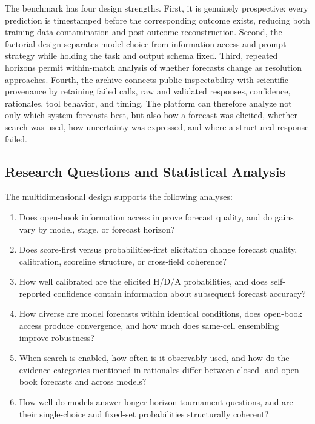 The benchmark has four design strengths. First, it is genuinely prospective: every prediction is
timestamped before the corresponding outcome exists, reducing both training-data contamination and
post-outcome reconstruction. Second, the factorial design separates model choice from information
access and prompt strategy while holding the task and output schema fixed. Third, repeated horizons
permit within-match analysis of whether forecasts change as resolution approaches. Fourth, the
archive connects public inspectability with scientific provenance by retaining failed calls, raw and
validated responses, confidence, rationales, tool behavior, and timing. The platform can therefore
analyze not only which system forecasts best, but also how a forecast was elicited, whether search was
used, how uncertainty was expressed, and where a structured response failed.

\subsection{Research Questions and Statistical Analysis}
\label{sec:research-questions}

The multidimensional design supports the following analyses:

\begin{enumerate}[leftmargin=1.6em,itemsep=2pt,topsep=2pt]
  \item[\textbf{RQ1}] Does open-book information access improve forecast quality, and do gains vary
  by model, stage, or forecast horizon?
  \item[\textbf{RQ2}] Does score-first versus probabilities-first elicitation change forecast quality,
  calibration, scoreline structure, or cross-field coherence?
  \item[\textbf{RQ3}] How well calibrated are the elicited H/D/A probabilities, and does
  self-reported confidence contain information about subsequent forecast accuracy?
  \item[\textbf{RQ4}] How diverse are model forecasts within identical conditions, does open-book
  access produce convergence, and how much does same-cell ensembling improve robustness?
  \item[\textbf{RQ5}] When search is enabled, how often is it observably used, and how do the evidence
  categories mentioned in rationales differ between closed- and open-book forecasts and across models?
  \item[\textbf{RQ6}] How well do models answer longer-horizon tournament questions, and are their
  single-choice and fixed-set probabilities structurally coherent?
\end{enumerate}

